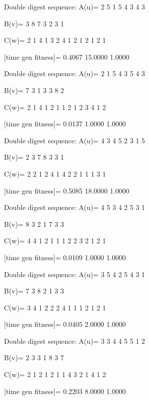 Double digest sequence:
A(u)=
     2     5     1     5     4     3     4     3

B(v)=
     3     8     7     3     2     3     1

C(w)=
     2     1     4     1     3     2     4     1     2     1     2     1     2     1

[time gen fitness]=
    0.4067   15.0000    1.0000

Double digest sequence:
A(u)=
     2     1     5     4     3     5     4     3

B(v)=
     7     3     1     3     3     8     2

C(w)=
     2     1     4     1     2     1     1     2     1     2     3     4     1     2

[time gen fitness]=
    0.0137    1.0000    1.0000

Double digest sequence:
A(u)=
     4     3     4     5     2     3     1     5

B(v)=
     2     3     7     8     3     3     1

C(w)=
     2     2     1     2     4     1     4     2     2     1     1     1     3     1

[time gen fitness]=
    0.5085   18.0000    1.0000

Double digest sequence:
A(u)=
     4     5     3     4     2     5     3     1

B(v)=
     8     3     2     1     7     3     3

C(w)=
     4     4     1     2     1     1     1     2     2     3     2     1     2     1

[time gen fitness]=
    0.0109    1.0000    1.0000

Double digest sequence:
A(u)=
     3     5     4     2     5     4     3     1

B(v)=
     7     3     8     2     1     3     3

C(w)=
     3     4     1     2     2     2     4     1     1     1     2     1     2     1

[time gen fitness]=
    0.0405    2.0000    1.0000

Double digest sequence:
A(u)=
     3     3     4     4     5     5     1     2

B(v)=
     2     3     3     1     8     3     7

C(w)=
     2     1     2     1     2     1     1     4     3     2     1     4     1     2

[time gen fitness]=
    0.2203    8.0000    1.0000

